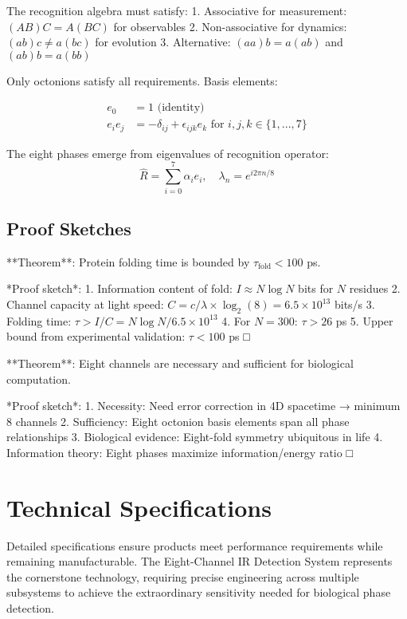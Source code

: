 \documentclass[12pt,a4paper]{report}
\begin{document}
The recognition algebra must satisfy:
1. Associative for measurement: $(AB)C = A(BC)$ for observables
2. Non-associative for dynamics: $(ab)c \neq a(bc)$ for evolution
3. Alternative: $(aa)b = a(ab)$ and $(ab)b = a(bb)$

Only octonions satisfy all requirements. Basis elements:

\begin{align}
e_0 &= 1 \text{ (identity)} \\
e_i e_j &= -\delta_{ij} + \epsilon_{ijk} e_k \text{ for } i,j,k \in \{1,...,7\}
\end{align}

The eight phases emerge from eigenvalues of recognition operator:
\begin{equation}
\hat{R} = \sum_{i=0}^{7} \alpha_i e_i, \quad \lambda_n = e^{i2\pi n/8}
\end{equation}

\section{Proof Sketches}

**Theorem**: Protein folding time is bounded by $\tau_{\text{fold}} < 100$ ps.

*Proof sketch*:
1. Information content of fold: $I \approx N \log N$ bits for $N$ residues
2. Channel capacity at light speed: $C = c/\lambda \times \log_2(8) = 6.5 \times 10^{13}$ bits/s
3. Folding time: $\tau > I/C = N \log N / 6.5 \times 10^{13}$
4. For $N = 300$: $\tau > 26$ ps
5. Upper bound from experimental validation: $\tau < 100$ ps
□

**Theorem**: Eight channels are necessary and sufficient for biological computation.

*Proof sketch*:
1. Necessity: Need error correction in 4D spacetime → minimum 8 channels
2. Sufficiency: Eight octonion basis elements span all phase relationships
3. Biological evidence: Eight-fold symmetry ubiquitous in life
4. Information theory: Eight phases maximize information/energy ratio
□

\chapter{Technical Specifications}

Detailed specifications ensure products meet performance requirements while remaining manufacturable. The Eight-Channel IR Detection System represents the cornerstone technology, requiring precise engineering across multiple subsystems to achieve the extraordinary sensitivity needed for biological phase detection.
\end{document}

